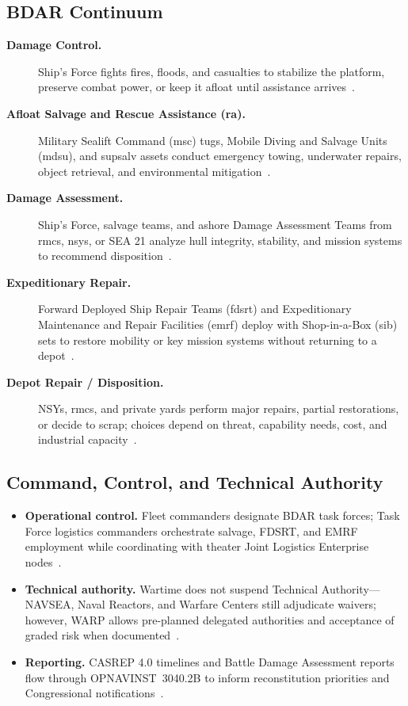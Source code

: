\documentclass[../main.tex]{subfiles}
\begin{document}
\subsection{BDAR Continuum}
\begin{description}
\item[\textbf{Damage Control.}] Ship's Force fights fires, floods, and casualties to stabilize the platform, preserve combat power, or keep it afloat until assistance arrives~\autocite{edo-4-1-6-bdar-2025}.
\item[\textbf{Afloat Salvage and Rescue Assistance (\ac{ra}).}] Military Sealift Command (\ac{msc}) tugs, Mobile Diving and Salvage Units (\ac{mdsu}), and \ac{supsalv} assets conduct emergency towing, underwater repairs, object retrieval, and environmental mitigation~\autocite{NAVSEA-4740-2H}.
\item[\textbf{Damage Assessment.}] Ship's Force, salvage teams, and ashore Damage Assessment Teams from \ac{rmc}s, \acp{nsy}, or SEA 21 analyze hull integrity, stability, and mission systems to recommend disposition~\autocite{edo-4-1-6-bdar-2025}.
\item[\textbf{Expeditionary Repair.}] Forward Deployed Ship Repair Teams (\ac{fdsrt}) and Expeditionary Maintenance and Repair Facilities (\ac{emrf}) deploy with Shop-in-a-Box (\ac{sib}) sets to restore mobility or key mission systems without returning to a depot~\autocite{CPF-MSP-PLANORD-2023,edo-4-1-6-bdar-2025}.
\item[\textbf{Depot Repair / Disposition.}] NSYs, \ac{rmc}s, and private yards perform major repairs, partial restorations, or decide to scrap; choices depend on threat, capability needs, cost, and industrial capacity~\autocite{edo-4-1-6-bdar-2025}.
\end{description}

\subsection{Command, Control, and Technical Authority}
\begin{itemize}
\item \textbf{Operational control.} Fleet commanders designate BDAR task forces; Task Force logistics commanders orchestrate salvage, FDSRT, and EMRF employment while coordinating with theater Joint Logistics Enterprise nodes~\autocite{NWP3-32,NWP4-12}.
\item \textbf{Technical authority.} Wartime does not suspend Technical Authority—NAVSEA, Naval Reactors, and Warfare Centers still adjudicate waivers; however, WARP allows pre-planned delegated authorities and acceptance of graded risk when documented~\autocite{SECNAV-WARP-2021}.
\item \textbf{Reporting.} CASREP 4.0 timelines and Battle Damage Assessment reports flow through OPNAVINST~3040.2B to inform reconstitution priorities and Congressional notifications~\autocite{OPNAVINST3040-2B}.
\end{itemize}
\end{document}

